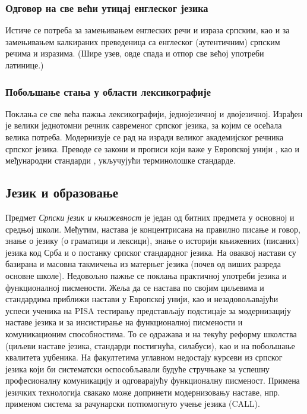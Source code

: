 \begin{multicols}{2}
\subsubsection {Одговор на све већи утицај енглеског језика}
   
 Истиче се потреба за замењивањем енглеских речи и израза српским, као и за замењивањем калкираних преведеница са енглеског (аутентичним) српским речима и изразима. (Шире узев, овде спада и отпор све већој употреби латинице.)
 
 \subsubsection {Побољшање стања у области лексикографије}
   
 Поклања се све већа пажња лексикографији, једнојезичној и двојезичној. Израђен је велики једнотомни речник савременог српског језика, за којим се осећала велика потреба. Модернизује се рад на изради великог академијског речника српског језика.
Преводе се закони и прописи који важе у Европској унији \cite{SEIO}, као и међународни стандарди \cite{ISS}, укључујући терминолошке стандарде.
 
 \subsection {Језик и образовање}
   
 
Предмет \textit{Српски језик и књижевност} је један од битних предмета у основној и средњој  школи. Међутим, настава је концентрисана на правилно писање и говор, знање о језику (о граматици и лексици), знање о историји књижевних (писаних) језика код Срба и о постанку српског стандардног језика. На оваквој настави су базирана и масовна такмичења из матерњег језика (почев од виших разреда основне школе). Недовољно пажње се поклања практичној употреби језика и функционалној писмености. 
Жеља да се настава по својим циљевима и стандардима приближи настави у Европској 
унији, као и   незадовољавајући успеси ученика на PISA тестирању представљају подстицаје за модернизацију наставе језика и за инсистирање на функционалној писмености и комуникационим способностима. То се одражава и на текућу реформу  школства (циљеви наставе језика, стандарди постигнућа, силабуси), као и на побољшање квалитета уџбеника. На факултетима углавном недостају курсеви из српског језика који би систематски оспособљавали будуће стручњаке за успешну професионалну комуникацију и одговарајућу функционалну писменост. 
Примена језичких технологија свакако може допринети  модернизовању наставе, нпр. применом система за рачунарски потпомогнуто учење језика (CALL). 
 

\end{multicols}
